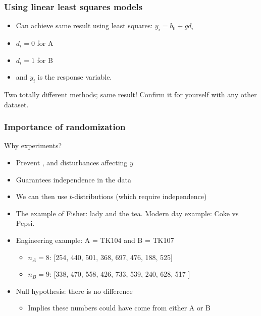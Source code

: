 \begin{frame}\frametitle{Using linear least squares models}
	\begin{itemize}
		\item	Can achieve same result using least squares: $y_i = b_0 + g d_i$
		\item	$d_i = 0$ for A
		\item	$d_i=1$ for B
		\item	and $y_i$ is the response variable.
	\end{itemize}
	
	\vspace{12pt}
	{\color{myOrange}{See question in this week's assignment.}}
	
	\vspace{12pt}
	Two totally different methods; same result! Confirm it for yourself with any other dataset.
\end{frame}

\begin{frame}\frametitle{Importance of randomization}

	Why {\color{purple}{randomize}} experiments?
	\begin{itemize}
		\item	Prevent {}, and {} disturbances affecting $y$
		\item	Guarantees independence in the data
		\item	We can then use $t$-distributions (which require independence)
	\end{itemize}
	\begin{itemize}
		\item	The example of Fisher: lady and the tea. Modern day example: Coke vs Pepsi.
		\item	Engineering example: A = TK104 and B = TK107
		\begin{itemize}
			\item	$n_A = 8$: [254, 440, 501, 368, 697, 476, 188, 525]
			\item	$n_B = 9$: [338, 470, 558, 426, 733, 539, 240, 628, 517 ]
		\end{itemize}
		\item	Null hypothesis: there is no difference
		\begin{itemize}
			\item	Implies these numbers could have come from either A or B
		\end{itemize}
	\end{itemize}
	{\color{myOrange}{Details of the analysis are given in the course textbook}}
\end{frame}

